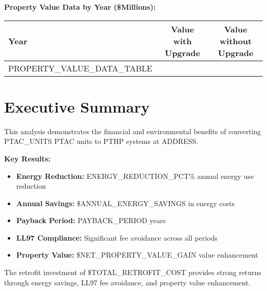 \documentclass[11pt,letterpaper]{article}
\begin{document}
\begin{center}
\end{center}

\textbf{Property Value Data by Year (\$Millions):}
\begin{center}
\begin{tabular}{lcc}
\hline
Year & Value with Upgrade & Value without Upgrade \\
\hline
{{PROPERTY_VALUE_DATA_TABLE}}
\hline
\end{tabular}
\end{center}

\section{Executive Summary}

This analysis demonstrates the financial and environmental benefits of converting {{PTAC_UNITS}} PTAC units to PTHP systems at {{ADDRESS}}.

\textbf{Key Results:}
\begin{itemize}
\item \textbf{Energy Reduction:} {{ENERGY_REDUCTION_PCT}}\% annual energy use reduction
\item \textbf{Annual Savings:} \${{ANNUAL_ENERGY_SAVINGS}} in energy costs
\item \textbf{Payback Period:} {{PAYBACK_PERIOD}} years
\item \textbf{LL97 Compliance:} Significant fee avoidance across all periods
\item \textbf{Property Value:} \${{NET_PROPERTY_VALUE_GAIN}} value enhancement
\end{itemize}

The retrofit investment of \${{TOTAL_RETROFIT_COST}} provides strong returns through energy savings, LL97 fee avoidance, and property value enhancement.
\end{document}
